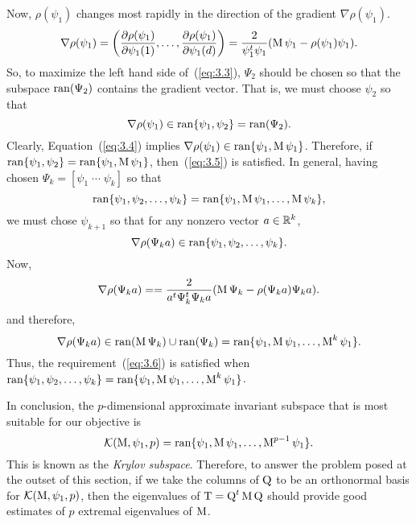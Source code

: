 Now, $\rho(\psi_1)$ changes most rapidly in the direction of the gradient
$\nabla \rho(\psi_1)$.
\begin{equation}
  \label{eq:3.4}
\nabla \rho(\psi_1) = \left(\frac{\partial \rho(\psi_1)}{\partial \psi_1(1)}, \dots,
\frac{\partial \rho(\psi_1)}{\partial \psi_1(d)}\right)
 = \frac{2}{\psi_1^t\psi_1} (\operatorname{M}\psi_1 - \rho(\psi_1)\psi_1).
\end{equation}
So, to maximize the left hand side of~(\ref{eq:3.3}), $\Psi_2$ should be chosen
so that the subspace $\operatorname{ran}(\Psi_2)$ contains the gradient vector.
That is, we must choose $\psi_2$ so that
\begin{equation}
\label{eq:3.5}
\nabla \rho(\psi_1) \in \operatorname{ran}\{\psi_1, \psi_2\} = \operatorname{ran}(\Psi_2).
\end{equation}
Clearly, Equation~(\ref{eq:3.4}) implies 
$\nabla \rho(\psi_1) \in \operatorname{ran}\{\psi_1, \operatorname{M}\psi_1\}$.
Therefore, if $\operatorname{ran}\{\psi_1, \psi_2\} = \operatorname{ran}\{\psi_1, \operatorname{M}\psi_1\}$, 
then~(\ref{eq:3.5}) is satisfied.
%
%
%
%
In general, having chosen $\Psi_k = [\psi_1 \; \cdots \; \psi_k]$ so that
\[
\operatorname{ran}\{\psi_1, \psi_2, \dots, \psi_k\} = \operatorname{ran}\{\psi_1, \operatorname{M}\psi_1, \dots,
\operatorname{M}\psi_k\},
\]
we must chose $\psi_{k+1}$ so that for any nonzero vector $a\in \mathbb{R}^k$,
\begin{equation}
\label{eq:3.6}
\nabla \rho(\Psi_ka) \in \operatorname{ran}\{\psi_1, \psi_2, \dots, \psi_k\}.
\end{equation}
Now,
\[
\nabla \rho(\Psi_ka)  = 
 = \frac{2}{a^t\Psi_k^t\Psi_ka} (\operatorname{M}\Psi_k - \rho(\Psi_ka)\Psi_ka).
\]
and therefore,
\[
\nabla \rho(\Psi_ka)  \in 
\operatorname{ran}(\operatorname{M}\Psi_k) \cup \operatorname{ran}(\Psi_k) = \operatorname{ran}\{\psi_1, \operatorname{M}\psi_1, \dots, \operatorname{M}^k\psi_1\}.
\]
Thus, the requirement~(\ref{eq:3.6}) is satisfied when 
$\operatorname{ran}\{\psi_1, \psi_2, \dots, \psi_k\} = \operatorname{ran}\{\psi_1, \operatorname{M}\psi_1, \dots, \operatorname{M}^k\psi_1\}$.

In conclusion, the $p$-dimensional approximate invariant subspace that is most suitable
for our objective is
\[
\mathcal{K}(\operatorname{M}, \psi_1, p) = \operatorname{ran}\{\psi_1, \operatorname{M}\psi_1, \dots, \operatorname{M}^{p-1}\psi_1\}.
\]
This is known as the \emph{Krylov subspace}. Therefore, to answer the problem posed at the outset
of this section, if we take the columns of $\operatorname{Q}$ to be an orthonormal basis for 
$\mathcal{K}(\operatorname{M},\psi_1, p)$, then the eigenvalues of $\operatorname{T} = \operatorname{Q}^t\operatorname{M}\operatorname{Q}$ should provide good
estimates of $p$ extremal eigenvalues of $\operatorname{M}$. 
%
%
%
%
